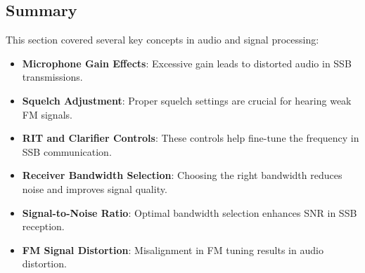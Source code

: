 
\subsection*{Summary}
This section covered several key concepts in audio and signal processing:
\begin{itemize}
    \item \textbf{Microphone Gain Effects}: Excessive gain leads to distorted audio in SSB transmissions.
    \item \textbf{Squelch Adjustment}: Proper squelch settings are crucial for hearing weak FM signals.
    \item \textbf{RIT and Clarifier Controls}: These controls help fine-tune the frequency in SSB communication.
    \item \textbf{Receiver Bandwidth Selection}: Choosing the right bandwidth reduces noise and improves signal quality.
    \item \textbf{Signal-to-Noise Ratio}: Optimal bandwidth selection enhances SNR in SSB reception.
    \item \textbf{FM Signal Distortion}: Misalignment in FM tuning results in audio distortion.
\end{itemize}
